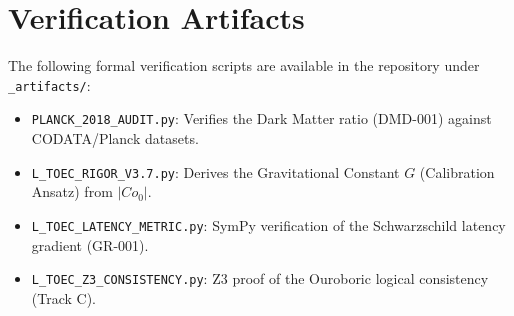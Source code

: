 \documentclass[11pt,titlepage]{article}
\begin{document}
\section{Verification Artifacts}
The following formal verification scripts are available in the repository under \texttt{\_artifacts/}:
\begin{itemize}
    
\item \texttt{PLANCK\_2018\_AUDIT.py}: Verifies the Dark Matter ratio (DMD-001) against CODATA/Planck datasets.
    
\item \texttt{L\_TOEC\_RIGOR\_V3.7.py}: Derives the Gravitational Constant $G$ (Calibration Ansatz) from $|Co_0|$.
    
\item \texttt{L\_TOEC\_LATENCY\_METRIC.py}: SymPy verification of the Schwarzschild latency gradient (GR-001).
    
\item \texttt{L\_TOEC\_Z3\_CONSISTENCY.py}: Z3 proof of the Ouroboric logical consistency (Track C).
\end{itemize}
\end{document}
